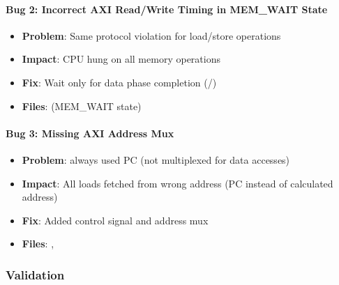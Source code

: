 \paragraph{\texorpdfstring{Bug 2: Incorrect AXI Read/\allowbreak{}Write
Timing in MEM\_WAIT
State}{Bug 2: Incorrect AXI Read/Write Timing in MEM\_WAIT State}}\label{cr:fix:fixes-index:bug-2-incorrect-axi-readwrite-timing-in-mem-wait-state}

\begin{record}

\begin{itemize}
\tightlist
\item
  \textbf{Problem}: Same protocol violation for load/\allowbreak{}store
  operations
\item
  \textbf{Impact}: CPU hung on all memory operations
\item
  \textbf{Fix}: Wait only for data phase completion
  (/)
\item
  \textbf{Files}:  (MEM\_WAIT state)
\end{itemize}

\end{record}

\paragraph{Bug 3: Missing AXI Address Mux}\label{cr:fix:fixes-index:bug-3-missing-axi-address-mux}

\begin{record}

\begin{itemize}
\tightlist
\item
  \textbf{Problem}:  always used PC (not multiplexed
  for data accesses)
\item
  \textbf{Impact}: All loads fetched from wrong address (PC instead of
  calculated address)
\item
  \textbf{Fix}: Added  control signal and address mux
\item
  \textbf{Files}: , 
\end{itemize}

\end{record}

\subsubsection{Validation}\label{cr:fix:fixes-index:validation}

